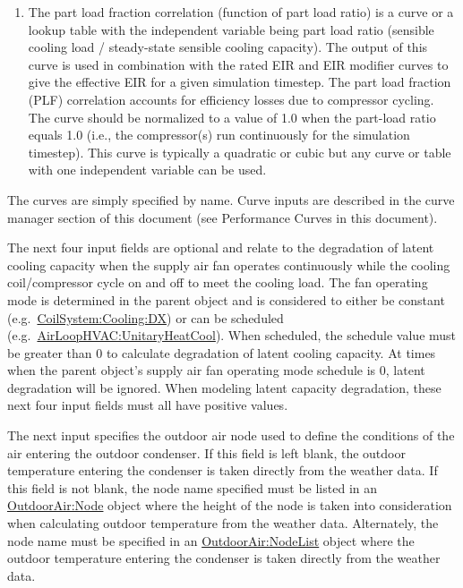 \begin{enumerate}
\item
  The part load fraction correlation (function of part load ratio) is a curve or a lookup table with the independent variable being part load ratio (sensible cooling load / steady-state sensible cooling capacity). The output of this curve is used in combination with the rated EIR and EIR modifier curves to give the effective EIR for a given simulation timestep. The part load fraction (PLF) correlation accounts for efficiency losses due to compressor cycling. The curve should be normalized to a value of 1.0 when the part-load ratio equals 1.0 (i.e., the compressor(s) run continuously for the simulation timestep). This curve is typically a quadratic or cubic but any curve or table with one independent variable can be used.
\end{enumerate}

The curves are simply specified by name. Curve inputs are described in the curve manager section of this document (see Performance Curves in this document).

The next four input fields are optional and relate to the degradation of latent cooling capacity when the supply air fan operates continuously while the cooling coil/compressor cycle on and off to meet the cooling load. The fan operating mode is determined in the parent object and is considered to either be constant (e.g.~\hyperref[coilsystemcoolingdx]{CoilSystem:Cooling:DX}) or can be scheduled (e.g.~\hyperref[airloophvacunitaryheatcool]{AirLoopHVAC:UnitaryHeatCool}). When scheduled, the schedule value must be greater than 0 to calculate degradation of latent cooling capacity. At times when the parent object's supply air fan operating mode schedule is 0, latent degradation will be ignored. When modeling latent capacity degradation, these next four input fields must all have positive values.

The next input specifies the outdoor air node used to define the conditions of the air entering the outdoor condenser. If this field is left blank, the outdoor temperature entering the condenser is taken directly from the weather data. If this field is not blank, the node name specified must be listed in an \hyperref[outdoorairnode]{OutdoorAir:Node} object where the height of the node is taken into consideration when calculating outdoor temperature from the weather data. Alternately, the node name must be specified in an \hyperref[outdoorairnodelist]{OutdoorAir:NodeList} object where the outdoor temperature entering the condenser is taken directly from the weather data.

